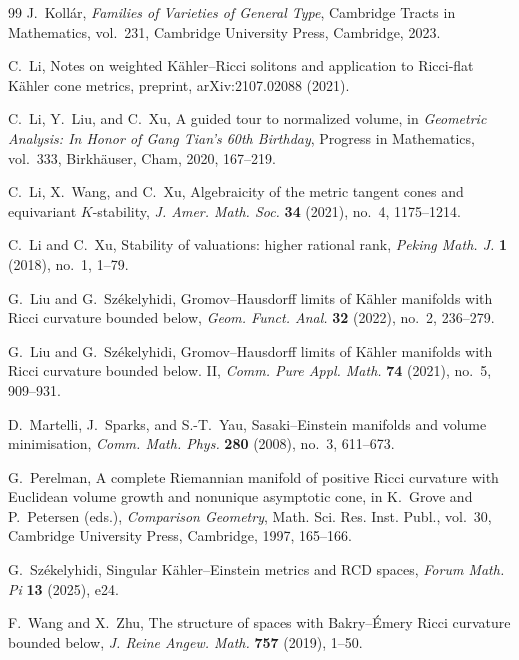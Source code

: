 \documentclass[11pt]{amsart}
\theoremstyle{definition}
\theoremstyle{remark}
\begin{document}
\begin{thebibliography}{99}
J.~Koll\'ar,
\newblock \emph{Families of Varieties of General Type},
\newblock Cambridge Tracts in Mathematics, vol.~231,
Cambridge University Press, Cambridge, 2023.

C.~Li,
\newblock Notes on weighted K\"ahler--Ricci solitons and application to
Ricci-flat K\"ahler cone metrics,
\newblock preprint, arXiv:2107.02088 (2021).

C.~Li, Y.~Liu, and C.~Xu,
\newblock A guided tour to normalized volume,
\newblock in \emph{Geometric Analysis: In Honor of Gang Tian's 60th Birthday},
Progress in Mathematics, vol.~333,
Birkh\"auser, Cham, 2020, 167--219.

C.~Li, X.~Wang, and C.~Xu,
\newblock Algebraicity of the metric tangent cones and equivariant $K$-stability,
\newblock \emph{J. Amer. Math. Soc.} \textbf{34} (2021), no.~4, 1175--1214.

C.~Li and C.~Xu,
\newblock Stability of valuations: higher rational rank,
\newblock \emph{Peking Math. J.} \textbf{1} (2018), no.~1, 1--79.

G.~Liu and G.~Sz\'ekelyhidi,
\newblock Gromov--Hausdorff limits of K\"ahler manifolds with Ricci curvature bounded below,
\newblock \emph{Geom. Funct. Anal.} \textbf{32} (2022), no.~2, 236--279.

G.~Liu and G.~Sz\'ekelyhidi,
\newblock Gromov--Hausdorff limits of K\"ahler manifolds with Ricci curvature bounded below. II,
\newblock \emph{Comm. Pure Appl. Math.} \textbf{74} (2021), no.~5, 909--931.

D.~Martelli, J.~Sparks, and S.-T.~Yau,
\newblock Sasaki--Einstein manifolds and volume minimisation,
\newblock \emph{Comm. Math. Phys.} \textbf{280} (2008), no.~3, 611--673.

G.~Perelman,
\newblock A complete Riemannian manifold of positive Ricci curvature with
Euclidean volume growth and nonunique asymptotic cone,
\newblock in K.~Grove and P.~Petersen (eds.),
\emph{Comparison Geometry},
Math. Sci. Res. Inst. Publ., vol.~30,
Cambridge University Press, Cambridge, 1997, 165--166.

G.~Sz\'ekelyhidi,
\newblock Singular K\"ahler--Einstein metrics and RCD spaces,
\newblock \emph{Forum Math. Pi} \textbf{13} (2025), e24.

F.~Wang and X.~Zhu,
\newblock The structure of spaces with Bakry--\'Emery Ricci curvature bounded below,
\newblock \emph{J. Reine Angew. Math.} \textbf{757} (2019), 1--50.

\end{thebibliography}
\end{document}
